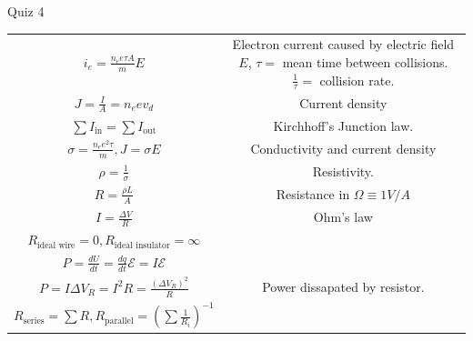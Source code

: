 \documentclass{article}
\begin{document}
\begin{center}
\begin{section}{Quiz 4}
\begin{tabular}{|c|c|}
		 $i_e = \frac{n_e e \tau A}{m} E$                                           & \makecell{Electron current caused by electric field $E$,            \\
		 $\tau=$ mean time between collisions. $\frac{1}{\tau}=$ collision rate.}                                                                         \\

		 $J = \frac{I}{A} = n_e e v_d$                                              & Current density                                                     \\

		 $\sum I_\text{in} = \sum I_\text{out}$                                     & Kirchhoff's Junction law.                                           \\

		 $\sigma = \frac{n_e e^2 \tau}{m}, J = \sigma E$                            & Conductivity and current density                                    \\

		 $\rho = \frac{1}{\sigma}$                                                  & Resistivity.                                                        \\


		 $R = \frac{\rho L}{A}$                                                     & Resistance in $\Omega \equiv 1 V/A$                                 \\

		 $I = \frac{\Delta V}{R}$                                                   & Ohm's law                                                           \\

		 $R_\text{ideal wire} = 0, R_\text{ideal insulator} = \infty$               &                                                                     \\

		 $P = \frac{dU}{dt} = \frac{dq}{dt} \mathcal E = I \mathcal E$              &                                                                     \\

		 $P = I \Delta V_R = I^2 R = \frac{(\Delta V_R)^2}{R}$                      & Power dissapated by resistor.                                       \\

		 $R_\text{series} = \sum R, R_\text{parallel}
		 = \left( \sum \frac{1}{R_i} \right)^{-1}$                                  &                                                                     \\


\end{tabular}
\end{section}
\end{center}
\end{document}
